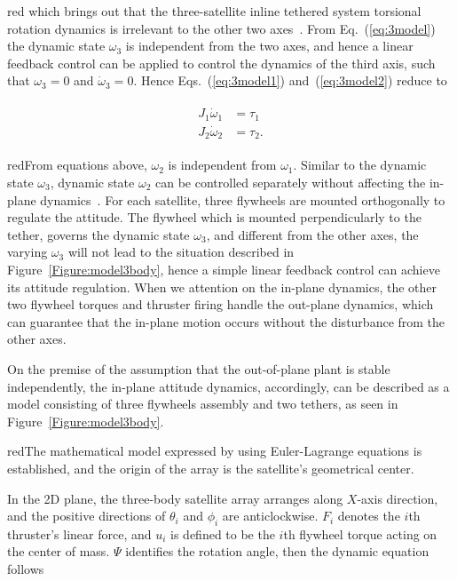 \begin{color}{red}
which brings out that the three-satellite inline tethered system torsional rotation dynamics is irrelevant to the other two axes~\cite{chung2008propellant1}. From Eq.~(\ref{eq:3model}) the dynamic state $\omega_3$ is independent from the two axes, and hence a linear feedback control can be applied to control the dynamics of the third axis, such that $\omega_3=0$ and $\dot\omega_3 = 0$. Hence Eqs.~(\ref{eq:3model1}) and~(\ref{eq:3model2}) reduce to
\end{color}
\begin{align}
\begin{split}
J_1\dot\omega_1&=\tau_1\\
J_2\dot\omega_2&=\tau_2.
\end{split}
\end{align} \begin{color}{red}From equations above, $\omega_2$ is independent from $\omega_1$. Similar to the dynamic state $\omega_3$, dynamic state $\omega_2$ can be controlled separately without affecting the in-plane dynamics~\cite{chung2007nonlinear,chung2007nonlinear1,chung2007nonlinear3}. For each satellite, three flywheels are mounted orthogonally to regulate the attitude. The flywheel which is mounted perpendicularly to the tether, governs the dynamic state $\omega_3$, and different from the other axes, the varying $\omega_3$ will not lead to the situation described in Figure~\ref{Figure:model3body}, hence a simple linear feedback control can achieve its attitude regulation. When we attention on the in-plane dynamics, the other two flywheel torques and thruster firing handle the out-plane dynamics, which can guarantee that the in-plane motion occurs without the disturbance from the other axes.\end{color} On the premise of the assumption that the out-of-plane plant is stable independently, the in-plane attitude dynamics, accordingly, can be described as a model consisting of three flywheels assembly and two tethers, as seen in Figure~\ref{Figure:model3body}. \begin{color}{red}The mathematical model expressed by using Euler-Lagrange equations is established, and the origin of the array is the satellite's geometrical center.\end{color} In the 2D plane, the three-body satellite array arranges along $X$-axis direction, and the positive directions of $\theta_i$ and $\phi_i$ are anticlockwise. $F_i$ denotes the $i$th thruster's linear force, and $u_i$ is defined to be the $i$th flywheel torque acting on the center of mass. $\Psi$ identifies the rotation angle, then the dynamic equation follows~\cite{chung2007nonlinear1}
